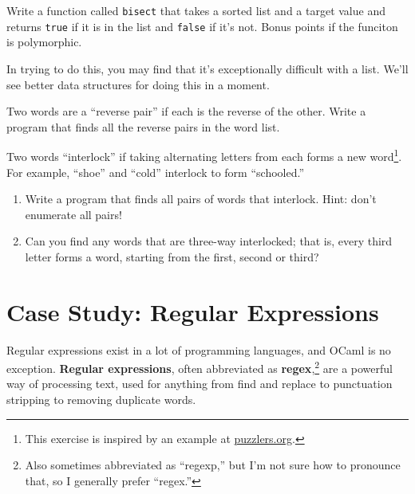 \documentclass[10pt]{book}
\begin{document}
{\begin{ex}
Write a function called {\tt bisect} that takes a sorted list
and a target value and returns {\tt true} if it is in the list
and {\tt false} if it's not. Bonus points if the funciton is 
polymorphic.

In trying to do this, you may find that it's exceptionally difficult
with a list. We'll see better data structures for doing this in a 
moment.

% 
\end{ex}

\begin{ex}

Two words are a ``reverse pair'' if each is the reverse of the
other.  Write a program that finds all the reverse pairs in the
word list. 
\end{ex}

\begin{ex}

Two words ``interlock'' if taking alternating letters from each forms
a new word\footnote{This exercise is inspired by an example at
  \url{puzzlers.org}.}.  For example, ``shoe'' and ``cold''
interlock to form ``schooled.''

\begin{enumerate}

\item Write a program that finds all pairs of words that interlock.
  Hint: don't enumerate all pairs!

\item Can you find any words that are three-way interlocked; that is,
  every third letter forms a word, starting from the first, second or
  third?

\end{enumerate}
\end{ex}

\chapter{Case Study: Regular Expressions}

Regular expressions exist in a lot of programming languages, and OCaml is no exception. {\bf Regular expressions}, often abbreviated as {\bf regex},\footnote{Also sometimes abbreviated as ``regexp,'' but I'm not sure how to pronounce that, so I generally prefer ``regex.''} are a powerful way of processing text, used for anything from find and replace to punctuation stripping to removing duplicate words.

}
\end{document}
